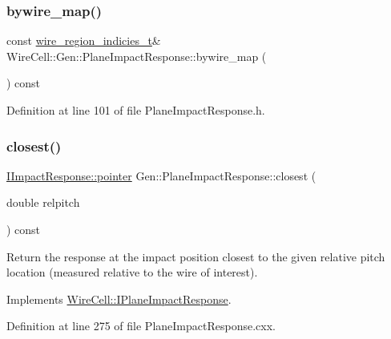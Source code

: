 \subsubsection{\texorpdfstring{bywire\+\_\+map()}{bywire\_map()}}
{\footnotesize\ttfamily const \hyperlink{class_wire_cell_1_1_gen_1_1_plane_impact_response_a383b0ed60a99682b46afeb5ecb446078}{wire\+\_\+region\+\_\+indicies\+\_\+t}\& Wire\+Cell\+::\+Gen\+::\+Plane\+Impact\+Response\+::bywire\+\_\+map (\begin{DoxyParamCaption}{ }\end{DoxyParamCaption}) const\hspace{0.3cm}{\ttfamily [inline]}}



Definition at line 101 of file Plane\+Impact\+Response.\+h.

\mbox{\label{class_wire_cell_1_1_gen_1_1_plane_impact_response_a1f0049663133e90f7c3b30f7dda63943}} 
\subsubsection{\texorpdfstring{closest()}{closest()}}
{\footnotesize\ttfamily \hyperlink{class_wire_cell_1_1_interface_a09c548fb8266cfa39afb2e74a4615c37}{I\+Impact\+Response\+::pointer} Gen\+::\+Plane\+Impact\+Response\+::closest (\begin{DoxyParamCaption}\item[{double}]{relpitch }\end{DoxyParamCaption}) const\hspace{0.3cm}{\ttfamily [virtual]}}

Return the response at the impact position closest to the given relative pitch location (measured relative to the wire of interest). 

Implements \hyperlink{class_wire_cell_1_1_i_plane_impact_response_acae9f97e8ec30523c563bd90a66b4eab}{Wire\+Cell\+::\+I\+Plane\+Impact\+Response}.



Definition at line 275 of file Plane\+Impact\+Response.\+cxx.

